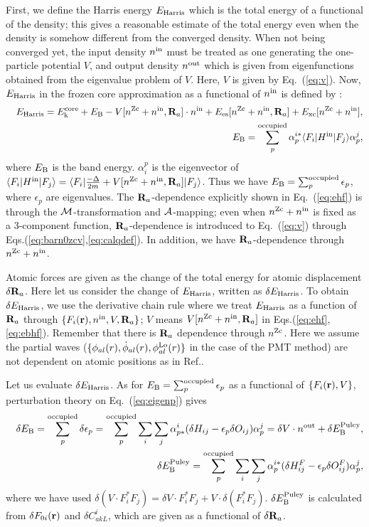 \documentclass[twocolumn,showpacs,preprintnumbers,amsmath,amssymb,floatfix]{revtex4-1}
\newcommand{\bfr}{{\bf r}}
\newcommand{\bfR}{{\bf R}}
\def\calR{{\cal A}}
\newcommand{\req}[1]{\mbox{Eq.~\!(\ref{#1})}}
\def\nzc{n^{\rm Zc}}
\def\MM{{\cal M}}
\def\ehf{E_{\rm Harris}}
\def\nin{n^{\rm in}}
\def\nout{n^{\rm out}}
\def\Vin{V}
\def\philo{{\phi}^{\rm Lo}_{al}}
\begin{document}
\begin{widetext}
First, we define the Harris energy $\ehf$ \cite{molforce,harris85} 
which is the total energy of a functional of the density; this gives
a reasonable estimate of the total energy even when the density is
somehow different from the converged density.
When not being converged yet, the input density $\nin$
must be treated as one generating the one-particle potential $V$,
and output density $\nout$ which is given from eigenfunctions
obtained from the eigenvalue problem of $V$. Here, $
V$ is given by \req{eq:v}. Now, $\ehf$ in the frozen core
approximation as a functional of $\nin$ is defined by \cite{molforce}:
\begin{eqnarray}
&&\ehf = E_{\rm k}^{\rm core} + E_{\rm B} - V[\nzc+\nin,\bfR_a] \cdot \nin 
+ E_{\rm es}[\nzc+\nin,\bfR_a] + E_{\rm xc}[\nzc+\nin],
\label{eq:ehf} \\
&&E_{\rm B} = \sum_p^{\rm occupied}
\alpha_{p}^{i*} 
\langle F_i|H^{\rm in}|F_j \rangle 
\alpha_p^j,
\label{eq:ebhf}
\end{eqnarray}
where $E_{\rm B}$ is the band energy.
$\alpha_i^p$ is the eigenvector of 
$\langle F_i|H^{\rm in}|F_j \rangle=
\langle F_i| \frac{-\Delta}{2m} + V[\nzc+\nin,\bfR_a] |F_j\rangle$.
Thus we have $E_{\rm B}=\sum^{\rm occupied}_p \epsilon_p$, where $\epsilon_p$ are eigenvalues.
The $\bfR_a$-dependence explicitly shown in \req{eq:ehf} is
through the $\MM$-transformation and $\calR$-mapping;
even when $\nzc+\nin$ is fixed as a 3-component function,
$\bfR_a$-dependence is introduced to \req{eq:v} through Eqs.(\ref{eq:barn0zcv},\ref{eq:calqdef}).
In addition, we have $\bfR_a$-dependence through $\nzc+\nin$.

Atomic forces are given as the change of the total energy 
for atomic displacement $\delta \bfR_a$.
Here let us consider the change of $\ehf$, written as $\delta \ehf$.
To obtain $\delta \ehf$, we use the derivative chain rule where we
treat $\ehf$ as a function of $\bfR_a$ through
$\{F_i(\bfr), \nin, \Vin, \bfR_a\}$; $\Vin$ means $V[\nzc+\nin,\bfR_a]$ in 
Eqs.(\ref{eq:ehf},\ref{eq:ebhf}).
Remember that there is $\bfR_a$ dependence through $\nzc$.
Here we assume the partial waves
($\{\phi_{al}(r),\dot{\phi}_{al}(r),\philo(r) \}$ in the case of the PMT
method) are not dependent on atomic positions as in Ref.\cite{molforce}.

Let us evaluate $\delta \ehf$. 
As for $E_{\rm B}=\sum_p^{\rm occupied} \epsilon_p$ 
as a functional of $\{F_i(\bfr),\Vin\}$, perturbation theory on
\req{eq:eigenp} gives
\begin{eqnarray}
&&\delta E_{\rm B} = \sum_p^{\rm occupied} \delta \epsilon_p
=\sum_p^{\rm occupied} \sum_i \sum_j 
\alpha_{p*}^i (\delta H_{ij} -\epsilon_p \delta O_{ij}) \alpha_p^j
=\delta \Vin\cdot \nout + \delta E_{\rm B}^{\rm Puley}, \label{eq:deleb}\\
&&\delta E_{\rm B}^{\rm Puley}=\sum_p^{\rm occupied} \sum_i \sum_j 
\alpha_{p}^{i*} (\delta H^F_{ij} -\epsilon_p \delta O^F_{ij}) \alpha_p^j,
\end{eqnarray}
where we have used $\delta (\Vin\cdot F^*_i F_j)=\delta \Vin 
\cdot F^*_i F_j + \Vin\cdot \delta (F^*_i F_j)$.
$\delta E_{\rm B}^{\rm Puley}$ is calculated from 
$\delta F_{0i}(\bfr)$ and $\delta C^i_{akL}$, which 
are given as a functional of $\delta \bfR_a$.


\end{widetext}
\end{document}
